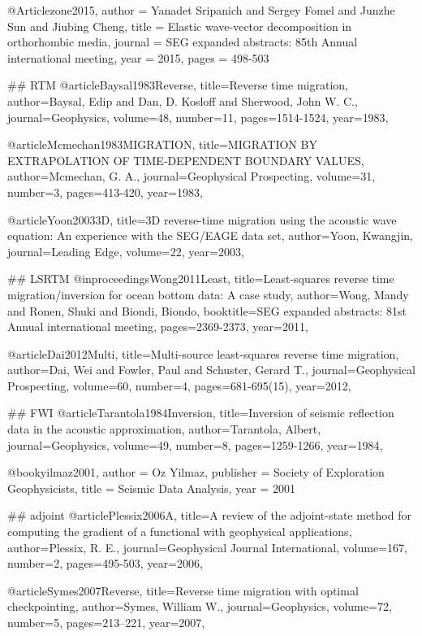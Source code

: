 {@Article{zone2015,
  author = 	 {Yanadet Sripanich and Sergey Fomel and Junzhe Sun and Jiubing Cheng},
  title = 	 {Elastic wave-vector decomposition in orthorhombic media},
  journal = 	 {SEG expanded abstracts: 85th Annual international meeting},
  year = 	 2015,
  pages =	 {498-503}
}


## RTM
@article{Baysal1983Reverse,
  title={Reverse time migration},
  author={Baysal, Edip and Dan, D. Kosloff and Sherwood, John W. C.},
  journal={Geophysics},
  volume={48},
  number={11},
  pages={1514-1524},
  year={1983},
}

@article{Mcmechan1983MIGRATION,
  title={MIGRATION BY EXTRAPOLATION OF TIME‐DEPENDENT BOUNDARY VALUES},
  author={Mcmechan, G. A.},
  journal={Geophysical Prospecting},
  volume={31},
  number={3},
  pages={413-420},
  year={1983},
}

@article{Yoon20033D,
  title={3{D} reverse-time migration using the acoustic wave equation: An experience with the SEG/EAGE data set},
  author={Yoon, Kwangjin},
  journal={Leading Edge},
  volume={22},
  year={2003},
}

## LSRTM
@inproceedings{Wong2011Least,
  title={Least‐squares reverse time migration/inversion for ocean bottom data: A case study},
  author={Wong, Mandy and Ronen, Shuki and Biondi, Biondo},
  booktitle={SEG expanded abstracts: 81st Annual international meeting},
  pages={2369-2373},
  year={2011},
}

@article{Dai2012Multi,
  title={Multi-source least-squares reverse time migration},
  author={Dai, Wei and Fowler, Paul and Schuster, Gerard T.},
  journal={Geophysical Prospecting},
  volume={60},
  number={4},
  pages={681-695(15)},
  year={2012},
}

## FWI
@article{Tarantola1984Inversion,
  title={Inversion of seismic reflection data in the acoustic approximation},
  author={Tarantola, Albert},
  journal={Geophysics},
  volume={49},
  number={8},
  pages={1259-1266},
  year={1984},
}

@book{yilmaz2001,
   author = {Oz Yilmaz},
   publisher = {Society of Exploration Geophysicists},
   title = {Seismic Data Analysis},
   year = {2001}
}

## adjoint
@article{Plessix2006A,
  title={A review of the adjoint-state method for computing the gradient of a functional with geophysical applications},
  author={Plessix, R. E.},
  journal={Geophysical Journal International},
  volume={167},
  number={2},
  pages={495-503},
  year={2006},
}

@article{Symes2007Reverse,
  title={Reverse time migration with optimal checkpointing},
  author={Symes, William W.},
  journal={Geophysics},
  volume={72},
  number={5},
  pages={213--221},
  year={2007},
}


}
